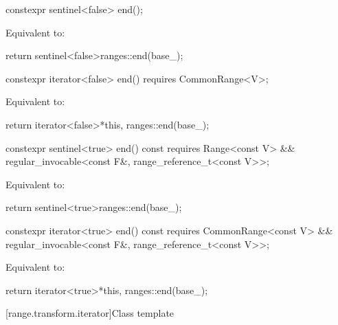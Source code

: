 %
\begin{itemdecl}
constexpr sentinel<false> end();
\end{itemdecl}

\begin{itemdescr}
\pnum
\effects Equivalent to:
\begin{codeblock}
return sentinel<false>{ranges::end(base_)};
\end{codeblock}
\end{itemdescr}

%
\begin{itemdecl}
constexpr iterator<false> end() requires CommonRange<V>;
\end{itemdecl}

\begin{itemdescr}
\pnum
\effects Equivalent to:
\begin{codeblock}
return iterator<false>{*this, ranges::end(base_)};
\end{codeblock}
\end{itemdescr}

%
\begin{itemdecl}
constexpr sentinel<true> end() const
  requires Range<const V> &&
           regular_invocable<const F&, range_reference_t<const V>>;
\end{itemdecl}

\begin{itemdescr}
\pnum
\effects Equivalent to:
\begin{codeblock}
return sentinel<true>{ranges::end(base_)};
\end{codeblock}
\end{itemdescr}

%
\begin{itemdecl}
constexpr iterator<true> end() const
  requires CommonRange<const V> &&
           regular_invocable<const F&, range_reference_t<const V>>;
\end{itemdecl}

\begin{itemdescr}
\pnum
\effects Equivalent to:
\begin{codeblock}
return iterator<true>{*this, ranges::end(base_)};
\end{codeblock}
\end{itemdescr}

[range.transform.iterator]{Class template }

